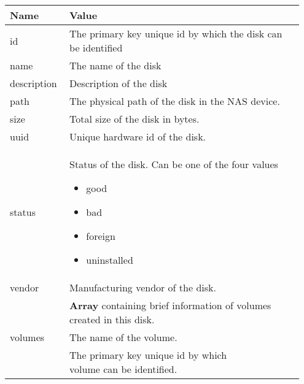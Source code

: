 \documentclass[letterpaper,10pt,english]{sphinxmanual}
\begin{document}
\begin{tabular}{|p{0.190\linewidth}|p{0.190\linewidth}|p{0.190\linewidth}|p{0.190\linewidth}|p{0.190\linewidth}|}
\hline
\textbf{
Name
} &  \multicolumn{4}{l|}{\textbf{
Value
}}\\\hline

id
 &  \multicolumn{4}{l|}{
The primary key unique id by which the disk can be
identified
}\\\hline

name
 &  \multicolumn{4}{l|}{
The name of the disk
}\\\hline

description
 &  \multicolumn{4}{l|}{
Description of the disk
}\\\hline

path
 &  \multicolumn{4}{l|}{
The physical path of the disk in the NAS device.
}\\\hline

size
 &  \multicolumn{4}{l|}{
Total size of the disk in bytes.
}\\\hline

uuid
 &  \multicolumn{4}{l|}{
Unique hardware id of the disk.
}\\\hline

status
 &  \multicolumn{4}{l|}{\label{disks:disk-status}
Status of the disk. Can be one of the four values
\begin{itemize}
\item {} 
good

\item {} 
bad

\item {} 
foreign

\item {} 
uninstalled

\end{itemize}
}\\\hline

vendor
 &  \multicolumn{4}{l|}{
Manufacturing vendor of the disk.
}\\\hline
 \multirow{7}{*}{
volumes
} &  \multicolumn{4}{l|}{
\textbf{Array} containing brief information of volumes
created in this disk.
}\\

name
 &  \multicolumn{3}{l|}{
The name of the volume.
}\\\hline

id
 &  \multicolumn{3}{l|}{
The primary key unique id by which
volume can be identified.
}\\\hline


\end{tabular}
\end{document}
